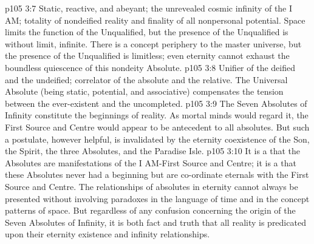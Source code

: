 \vs p105 3:7 \bibnobreakspace {} Static, reactive, and abeyant; the unrevealed cosmic infinity of the I AM; totality of nondeified reality and finality of all nonpersonal potential. Space limits the function of the Unqualified, but the presence of the Unqualified is without limit, infinite. There is a concept periphery to the master universe, but the presence of the Unqualified is limitless; even eternity cannot exhaust the boundless quiescence of this nondeity Absolute.
\vs p105 3:8 \bibnobreakspace {} Unifier of the deified and the undeified; correlator of the absolute and the relative. The Universal Absolute (being static, potential, and associative) compensates the tension between the ever\hyp{}existent and the uncompleted.
\vs p105 3:9 \pc The Seven Absolutes of Infinity constitute the beginnings of reality. As mortal minds would regard it, the First Source and Centre would appear to be antecedent to all absolutes. But such a postulate, however helpful, is invalidated by the eternity coexistence of the Son, the Spirit, the three Absolutes, and the Paradise Isle.
\vs p105 3:10 It is a  that the Absolutes are manifestations of the I AM\hyp{}First Source and Centre; it is a  that these Absolutes never had a beginning but are co\hyp{}ordinate eternals with the First Source and Centre. The relationships of absolutes in eternity cannot always be presented without involving paradoxes in the language of time and in the concept patterns of space. But regardless of any confusion concerning the origin of the Seven Absolutes of Infinity, it is both fact and truth that all reality is predicated upon their eternity existence and infinity relationships.
